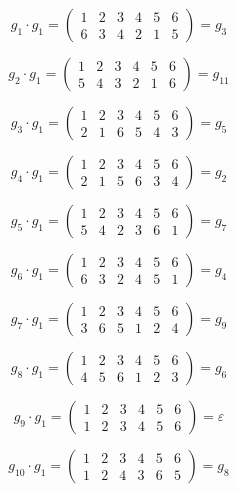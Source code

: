\documentclass[utf8,14pt,a4paper,oneside,russian]{book}
\begin{document}
	\[ g_{1}\cdot g_{1} = \left( 
	\begin{array}{cccccc}
	1&2&3&4&5&6\\
	6&3&4&2&1&5
	\end{array} 
	\right) = g_{3} \]
	
	\[ g_{2}\cdot g_{1} = \left( 
	\begin{array}{cccccc}
	1&2&3&4&5&6\\
	5&4&3&2&1&6
	\end{array} 
	\right) = g_{11} \]
	
	\[ g_{3}\cdot g_{1} = \left( 
	\begin{array}{cccccc}
	1&2&3&4&5&6\\
	2&1&6&5&4&3
	\end{array} 
	\right) = g_{5} \]
	
	\[ g_{4}\cdot g_{1} = \left( 
	\begin{array}{cccccc}
	1&2&3&4&5&6\\
	2&1&5&6&3&4
	\end{array} 
	\right) = g_{2} \]
	
	\[ g_{5}\cdot g_{1} = \left( 
	\begin{array}{cccccc}
	1&2&3&4&5&6\\
	5&4&2&3&6&1
	\end{array} 
	\right) = g_{7} \]
	
	\[ g_{6}\cdot g_{1} = \left( 
	\begin{array}{cccccc}
	1&2&3&4&5&6\\
	6&3&2&4&5&1
	\end{array} 
	\right) = g_{4} \]
	
	\[ g_{7}\cdot g_{1} = \left( 
	\begin{array}{cccccc}
	1&2&3&4&5&6\\
	3&6&5&1&2&4
	\end{array} 
	\right) = g_{9} \]
	
	\[ g_{8}\cdot g_{1} = \left( 
	\begin{array}{cccccc}
	1&2&3&4&5&6\\
	4&5&6&1&2&3
	\end{array} 
	\right) = g_{6} \]
	
	\[ g_{9}\cdot g_{1} = \left( 
	\begin{array}{cccccc}
	1&2&3&4&5&6\\
	1&2&3&4&5&6
	\end{array} 
	\right) = \varepsilon \]
	
	\[ g_{10}\cdot g_{1} = \left( 
	\begin{array}{cccccc}
	1&2&3&4&5&6\\
	1&2&4&3&6&5
	\end{array} 
	\right) = g_{8} \]
	
\end{document}
